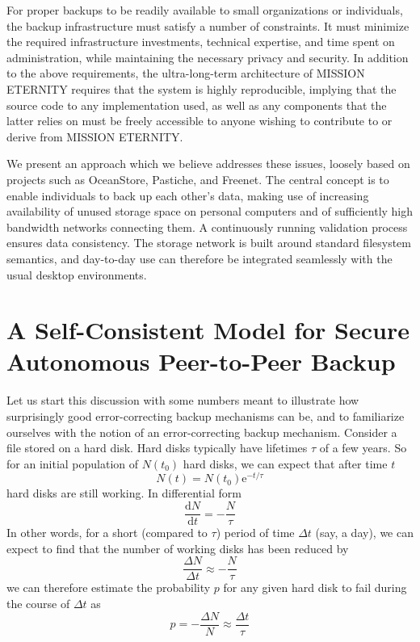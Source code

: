 \documentclass[11pt]{article}
\begin{document}
\begin{mainmatter}
For proper backups to be readily available to small organizations or individuals, the backup infrastructure must satisfy a number of constraints. It must minimize the required infrastructure investments, technical expertise, and time spent on administration, while maintaining the necessary privacy and security. In addition to the above requirements, the ultra-long-term architecture of MISSION ETERNITY requires that the system is highly reproducible, implying that the source code to any implementation used, as well  as any components that the latter relies on must be freely accessible to anyone wishing to contribute to or derive from MISSION ETERNITY.

We present an approach which we believe addresses these issues, loosely based on projects such as OceanStore\cite{oceanstore}, Pastiche\cite{pastiche}, and Freenet\cite{freenet}. The central concept is to enable individuals to back up each other's data, making use of increasing availability of unused storage space on personal computers and of sufficiently high bandwidth networks  connecting them. A continuously running validation process ensures data consistency. The storage network is built around standard filesystem semantics, and day-to-day use can therefore be integrated seamlessly with the usual desktop environments. 

\section{A Self-Consistent Model for Secure Autonomous Peer-to-Peer Backup}

Let us start this discussion with some numbers meant to illustrate how surprisingly good error-correcting backup mechanisms can be, and to familiarize ourselves with the notion of an error-correcting backup mechanism. Consider a file stored on a hard disk. Hard disks typically have lifetimes $\tau$ of a few years. So for an initial population of $N(t_0)$ hard disks, we can expect that after time $t$
\begin{equation}
N(t) = N(t_0) \mathrm e^{-t / \tau}
\end{equation}
hard disks are still working. In differential form
\begin{equation}
\frac{\mathrm d N}{\mathrm d t} = -\frac{N}{\tau}
\end{equation}
In other words, for a short (compared to $\tau$) period of time $\Delta t$ (say, a day), we can expect to find that the number of working disks has been reduced by
\begin{equation}
\frac{\Delta N}{\Delta t} \approx -\frac{N}{\tau}
\end{equation}
we can therefore estimate the probability $p$ for any given hard disk to fail during the course of $\Delta t$ as
\begin{equation}
p = -\frac{\Delta N}{N} \approx \frac{\Delta t}{\tau}
\label{destroySmall}
\end{equation}


\end{mainmatter}
\end{document}
